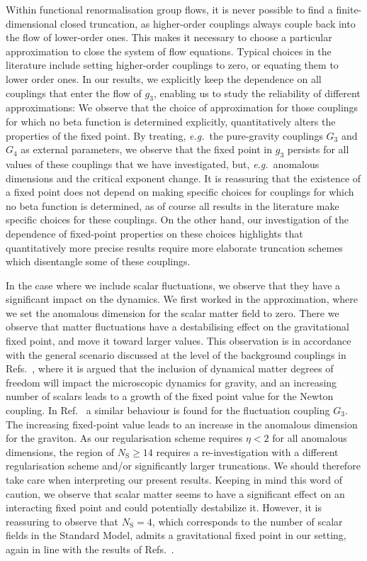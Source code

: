 \documentclass[11pt]{book}
\newcommand\NS{ N_{\scriptscriptstyle{\mathrm{S}}} }
\newcommand\eg{\textit{e.g.}\ }
\numberwithin{equation}{chapter}
\begin{document}
Within functional renormalisation group flows, it is never possible to find a finite-dimensional
closed truncation, as higher-order couplings always couple back into the flow of lower-order ones.
This makes it necessary to choose a particular approximation to close the system of flow equations.
Typical choices in the literature include setting higher-order couplings to zero,
or equating them to lower order ones. In our results,
we explicitly keep the dependence on all couplings that enter the flow of $g_3$,
enabling us to study the reliability of different approximations:
We observe that the choice of approximation for those couplings for which no beta function is
determined explicitly, quantitatively alters the properties of the fixed point. By treating,
\eg the pure-gravity couplings $G_3$ and $G_4$ as external parameters, we observe that the
fixed point in $g_3$ persists for all values of these couplings that we have investigated,
but, \eg anomalous dimensions and the critical exponent change.
It is reassuring that the existence of a fixed point does not  depend on making specific choices
for couplings for which no beta function is determined, as of course all results in the literature
make specific choices for these couplings.
On the other hand, our investigation of the dependence of fixed-point properties on these
choices highlights that quantitatively more precise results require more elaborate truncation
schemes which disentangle some of these couplings.

In the case where we include scalar fluctuations, we observe that they have a significant impact on the
dynamics.
We first worked in the approximation, where we set the anomalous dimension for the scalar matter field to zero.
There we observe that matter fluctuations have a destabilising effect on the gravitational fixed point,
and move it toward larger values.
This observation is in accordance with the general scenario discussed at the level of the
background couplings in Refs.~\cite{Dona:2013qba, Dona:2014pla},
where it is argued that the inclusion of dynamical matter degrees of freedom will impact
the microscopic dynamics for gravity, and an increasing number of scalars leads to a growth of the
fixed point value for the Newton coupling.
In Ref.~\cite{Meibohm:2015twa} a similar behaviour is found for the fluctuation coupling $G_3$.
The increasing fixed-point value leads to an increase in the anomalous dimension for the graviton.
As our regularisation scheme requires $\eta<2$ for all anomalous dimensions,
the region of $\NS \geq 14$ requires a re-investigation with a different regularisation
scheme and/or significantly larger truncations.
We should therefore take care when interpreting our present results.
Keeping in mind this word of caution, we observe that scalar matter seems to have a significant
effect on an interacting fixed point and could potentially destabilize it.
However, it is reassuring to observe that $\NS=4$, which corresponds to the number of
scalar fields in the Standard Model, admits a gravitational fixed point in our setting,
again in line with the results of Refs.~\cite{Dona:2013qba, Dona:2014pla, Meibohm:2015twa}.
\end{document}
